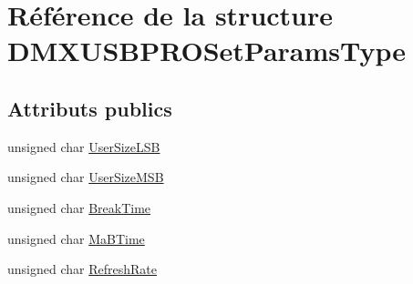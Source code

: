 \hypertarget{struct_d_m_x_u_s_b_p_r_o_set_params_type}{\section{Référence de la structure D\+M\+X\+U\+S\+B\+P\+R\+O\+Set\+Params\+Type}
\label{struct_d_m_x_u_s_b_p_r_o_set_params_type}
}
\subsection*{Attributs publics}
\begin{DoxyCompactItemize}
\item 
unsigned char \hyperlink{struct_d_m_x_u_s_b_p_r_o_set_params_type_a849e4ebeb6ebb38a6b2fc53c32d4456d}{User\+Size\+L\+S\+B}
\item 
unsigned char \hyperlink{struct_d_m_x_u_s_b_p_r_o_set_params_type_adae7671559ec6924d03fd27f50d6fda0}{User\+Size\+M\+S\+B}
\item 
unsigned char \hyperlink{struct_d_m_x_u_s_b_p_r_o_set_params_type_ad5a0ccbc024303300f2933f16046abd4}{Break\+Time}
\item 
unsigned char \hyperlink{struct_d_m_x_u_s_b_p_r_o_set_params_type_a766ed7ac1cd093a822fa905f43f81129}{Ma\+B\+Time}
\item 
unsigned char \hyperlink{struct_d_m_x_u_s_b_p_r_o_set_params_type_a1e0b6924aa027f23f1bbd5606cbe09e7}{Refresh\+Rate}
\end{DoxyCompactItemize}


